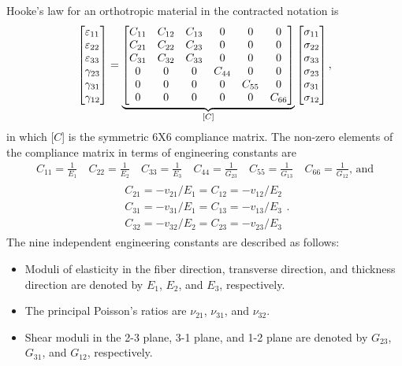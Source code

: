 \documentclass{AeroStructure-ERJohnson}
\begin{document}
Hooke's law for an orthotropic material in the contracted notation
is
\begin{align}\label{eq8.3}
\left[\begin{array}{@{}l@{}} \varepsilon_{11}\\
\varepsilon_{22}\\
\varepsilon_{33}\\
\gamma_{23}\\
\gamma_{31}\\
\gamma_{12}
\end{array}\right]=\underbrace{\left[\begin{array}{@{}cccccc@{}}
C_{11} & C_{12} & C_{13} & 0 & 0 & 0\\
C_{21} & C_{22} & C_{23} &
0 & 0 & 0\\
C_{31} & C_{32} & C_{33} & 0 & 0 & 0\\
0 & 0 & 0 &
C_{44} & 0 & 0\\
0 & 0 & 0 & 0 & C_{55} & 0\\
0 & 0 & 0 & 0 & 0
& C_{66} \end{array}\right]}_{[C]}\left[\begin{array}{@{}l@{}}
\sigma_{11}\\
\sigma_{22}\\
\sigma_{33}\\
\sigma_{23}\\
\sigma_{31}\\
\sigma_{12} \end{array}\right] ,
\end{align}
in which [$C$] is the symmetric 6X6 compliance matrix. The
non-zero elements of the compliance matrix in terms of engineering
constants are
\begin{align}
C_{11}=\frac{1}{E_{1}} \quad C_{22}=\frac{1}{E_{2}} \quad C_{33}=\frac{1}{E_{3}} \quad C_{44}=\frac{1}{G_{23}} \quad C_{55}=\frac{1}{G_{13}} \quad C_{66}=\frac{1}{G_{12}}\mbox{, and}\label{eq8.4}
\end{align}
\pagebreak
\begin{gather}
\begin{split}\label{eq8.5}
C_{21}=-v_{21}/ E_{1}=C_{12}=-v_{12}/ E_{2}\\
C_{31}=-v_{31}/ E_{1}=C_{13}=-v_{13}/ E_{3}\\
C_{32}=-v_{32}/ E_{2}=C_{23}=-v_{23}/ E_{3}
\end{split}.
\end{gather}
The nine independent engineering constants are described as
follows:
\begin{itemize}
\item Moduli of elasticity in the fiber direction, transverse direction, and thickness direction are denoted by $E_1$, $E_2$, and $E_3$, respectively.

\item The principal Poisson's ratios are $\nu_{21}$, $\nu_{31}$, and $\nu_{32}$.

\item Shear moduli in the 2-3 plane, 3-1 plane, and 1-2 plane are denoted by $G_{23}$, $G_{31}$, and $G_{12}$, respectively.
\end{itemize}
\end{document}
